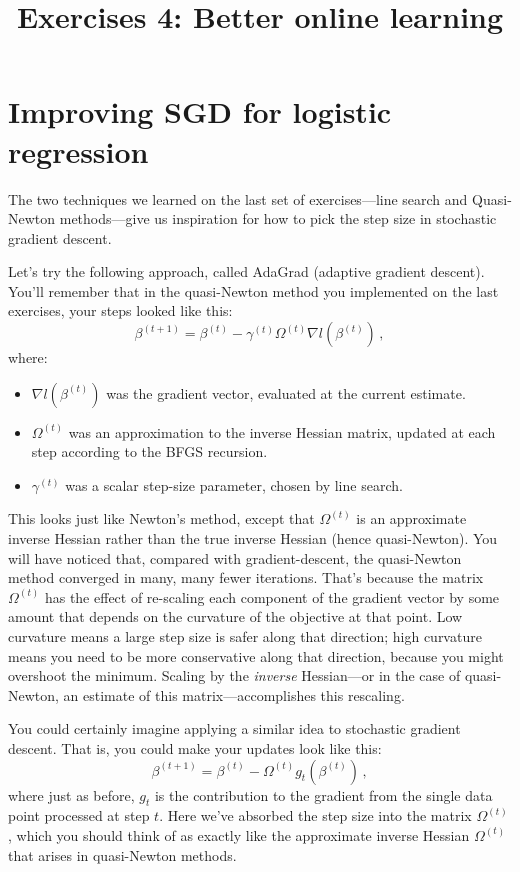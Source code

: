 \documentclass{mynotes}
\title[Exercises 4 $\cdot$ SDS 385]{Exercises 4: Better online learning}
\date{}  %
\begin{document}
\maketitle%

\bigskip


\section{Improving SGD for logistic regression}

The two techniques we learned on the last set of exercises---line search and Quasi-Newton methods---give us inspiration for how to pick the step size in stochastic gradient descent.

Let's try the following approach, called AdaGrad (adaptive gradient descent).  You'll remember that in the quasi-Newton method you implemented on the last exercises, your steps looked like this:
$$
\beta^{(t+1)} = \beta^{(t)} - \gamma^{(t)} \Omega^{(t)} \nabla l(\beta^{(t)}) \, ,
$$
where:
\begin{itemize}
\item $\nabla l(\beta^{(t)})$ was the gradient vector, evaluated at the current estimate.
\item $\Omega^{(t)}$ was an approximation to the inverse Hessian matrix, updated at each step according to the BFGS recursion.
\item $\gamma^{(t)}$ was a scalar step-size parameter, chosen by line search.
\end{itemize}
This looks just like Newton's method, except that $\Omega^{(t)}$ is an approximate inverse Hessian rather than the true inverse Hessian (hence quasi-Newton).  You will have noticed that, compared with gradient-descent, the quasi-Newton method converged in many, many fewer iterations.  That's because the matrix $\Omega^{(t)}$ has the effect of re-scaling each component of the gradient vector by some amount that depends on the curvature of the objective at that point.  Low curvature means a large step size is safer along that direction; high curvature means you need to be more conservative along that direction, because you might overshoot the minimum.  Scaling by the \emph{inverse} Hessian---or in the case of quasi-Newton, an estimate of this matrix---accomplishes this rescaling.

You could certainly imagine applying a similar idea to stochastic gradient descent.  That is, you could make your updates look like this:
\begin{equation}
\label{eqn:online_quasi_newton}
\beta^{(t+1)} = \beta^{(t)} - \Omega^{(t)} g_t(\beta^{(t)}) \, ,
\end{equation}
where just as before, $g_t$ is the contribution to the gradient from the single data point processed at step $t$.  Here we've absorbed the step size into the matrix $\Omega^{(t)}$, which you should think of as exactly like the approximate inverse Hessian $\Omega^{(t)}$ that arises in quasi-Newton methods.
\end{document}
